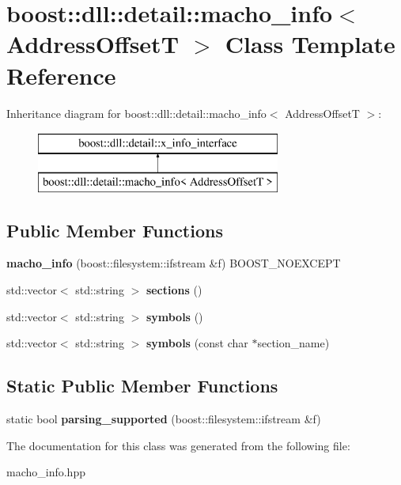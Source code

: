 \hypertarget{a00198}{}\section{boost\+:\+:dll\+:\+:detail\+:\+:macho\+\_\+info$<$ Address\+OffsetT $>$ Class Template Reference}
\label{a00198}
Inheritance diagram for boost\+:\+:dll\+:\+:detail\+:\+:macho\+\_\+info$<$ Address\+OffsetT $>$\+:\begin{figure}[H]
\begin{center}
\leavevmode
\includegraphics[height=2.000000cm]{a00198}
\end{center}
\end{figure}
\subsection*{Public Member Functions}
\begin{DoxyCompactItemize}
\item 
{\bfseries macho\+\_\+info} (boost\+::filesystem\+::ifstream \&f) B\+O\+O\+S\+T\+\_\+\+N\+O\+E\+X\+C\+E\+PT\hypertarget{a00198_a08bfca5d9a4e5c054bca9d19403e12cb}{}\label{a00198_a08bfca5d9a4e5c054bca9d19403e12cb}

\item 
std\+::vector$<$ std\+::string $>$ {\bfseries sections} ()\hypertarget{a00198_a5603b35ac4c0693171cb599f445393db}{}\label{a00198_a5603b35ac4c0693171cb599f445393db}

\item 
std\+::vector$<$ std\+::string $>$ {\bfseries symbols} ()\hypertarget{a00198_a90b4d8fbb81d373ee28a4b39ec4b9619}{}\label{a00198_a90b4d8fbb81d373ee28a4b39ec4b9619}

\item 
std\+::vector$<$ std\+::string $>$ {\bfseries symbols} (const char $\ast$section\+\_\+name)\hypertarget{a00198_aa2a7f51eae5236803aeb7bf4b242b7cd}{}\label{a00198_aa2a7f51eae5236803aeb7bf4b242b7cd}

\end{DoxyCompactItemize}
\subsection*{Static Public Member Functions}
\begin{DoxyCompactItemize}
\item 
static bool {\bfseries parsing\+\_\+supported} (boost\+::filesystem\+::ifstream \&f)\hypertarget{a00198_aa6195fe2c2a18d5348627a337ee77be3}{}\label{a00198_aa6195fe2c2a18d5348627a337ee77be3}

\end{DoxyCompactItemize}


The documentation for this class was generated from the following file\+:\begin{DoxyCompactItemize}
\item 
macho\+\_\+info.\+hpp\end{DoxyCompactItemize}
